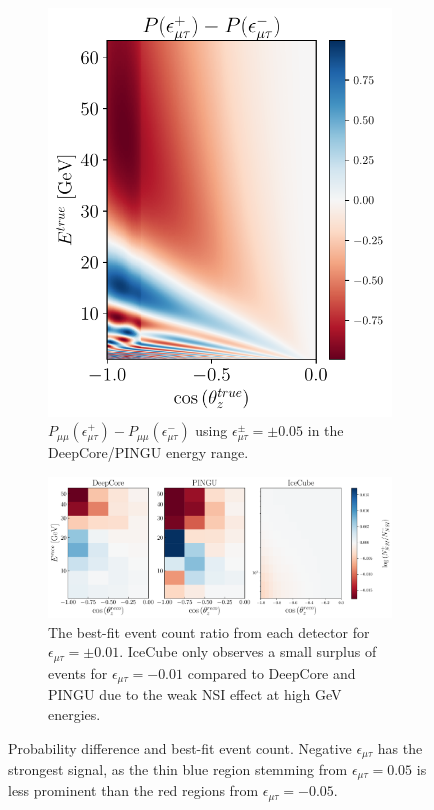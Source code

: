 \documentclass[draft=True]{revtex4-2}
\newcommand{\emt}{\ensuremath{\epsilon_{\mu\tau}}}
\begin{document}
{\begin{figure}
   \begin{subfigure}{0.25\textwidth}
      \includegraphics[width=1\linewidth]{figures/Pmm_asymmetry.pdf}%
      \caption{$P_{\mu\mu}(\epsilon^+_{\mu\tau}) - P_{\mu\mu}(\epsilon^-_{\mu\tau})$ using  $\epsilon^\pm_{\mu\tau} = \pm 0.05$ in the DeepCore/PINGU energy range.}\label{fig:Pmm_asymmetry}
   \end{subfigure}
   \begin{subfigure}{0.6\textwidth}
      \includegraphics[width=1\linewidth]{figures/emt_events.pdf}
   \caption{The best-fit event count ratio from each detector for $\emt = \pm 0.01$. IceCube only observes a small surplus of events for $\emt=-0.01$ compared to 
   DeepCore and PINGU due to the weak NSI effect at high \si{\GeV} energies.}\label{fig:emt_events}%
   \end{subfigure}
   \caption{Probability difference and best-fit event count. Negative $\emt$ has the strongest signal, as the thin blue 
   region stemming from $\emt = 0.05$ is less prominent than the red regions from $\emt=-0.05$.}
\end{figure}


}
\end{document}
